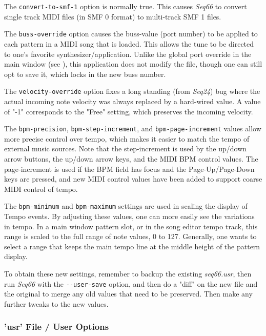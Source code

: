    The \texttt{convert-to-smf-1} option is normally true. This causes
   \textsl{Seq66} to convert single track MIDI files (in SMF 0 format) to
   multi-track SMF 1 files.

   The \texttt{buss-override} option causes the buss-value (port number) to be
   applied to each pattern in a MIDI song that is loaded.  This allows the tune
   to be directed to one's favorite synthesizer/application.
   Unlike the global port override in the main window
   (see ),
   this application does not modify the file, though one can still opt to save
   it, which locks in the new buss number.

   The \texttt{velocity-override} option fixes a long standing (from
   \textsl{Seq24}) bug where the actual incoming note velocity was always
   replaced by a hard-wired value.  A value of "-1" corresponds to the "Free"
   setting, which preserves the incoming velocity.

   The \texttt{bpm-precision}, \texttt{bpm-step-increment}, and
   \texttt{bpm-page-increment} values allow more precise control over tempo,
   which makes it easier to match the tempo of external music sources.  Note
   that the step-increment is used by the up/down arrow buttons, the up/down
   arrow keys, and the MIDI BPM control values.  The page-increment is used
   if the BPM field has focus and the Page-Up/Page-Down keys are pressed,
   and new MIDI control values have been added to support coarse MIDI
   control of tempo.

   The \texttt{bpm-minimum} and \texttt{bpm-maximum} settings
   are used in scaling the display of Tempo events.
   By adjusting these values, one can more easily see the variations in
   tempo.  In a main window pattern slot, or in the song editor tempo track,
   this range is scaled to the full range of note values, 0 to 127.
   Generally, one wants to select a range that keeps the main tempo line at
   the middle height of the pattern display.

   To obtain these new settings, remember to backup the existing
   \textsl{seq66.usr}, then run \textsl{Seq66} with the
   \texttt{-{}-user-save} option, and then do a "diff" on the new file and the
   original to merge any old values that need to be preserved.  Then make any
   further tweaks to the new values.

\subsubsection{'usr' File / User Options}
\label{subsubsec:usr_file_user_options}

